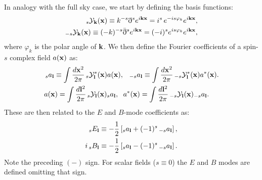 \documentclass[usenatbib]{mnrasb}
\begin{document}
      In analogy with the full sky case, we start by defining the basis functions:
      \begin{align}
        \,_s{\cal Y}_{\bf k}({\bf x})\equiv k^{-s}\eth^se^{i{\bf k}{\bf x}}=i^s\,e^{-is\varphi_k}e^{i{\bf k}{\bf x}},\\
        _{-s}{\cal Y}_{\bf k}({\bf x})\equiv (-k)^{-s}\bar{\eth}^se^{i{\bf k}{\bf x}}=(-i)^se^{is\varphi_k}e^{i{\bf k}{\bf x}},
      \end{align}
      where $\varphi_k$ is the polar angle of ${\bf k}$. We then define the Fourier coefficients of a spin-$s$ complex field $a({\bf x})$ as:
      \begin{align}\nonumber
        &\,_sa_{\bf l}\equiv\int\frac{d{\bf x}^2}{2\pi}\,_s{\cal Y}^*_{\bf l}({\bf x})a({\bf x}),\hspace{6pt}
        \,_{-s}a_{\bf l}\equiv\int\frac{d{\bf x}^2}{2\pi}\,_{-s}{\cal Y}^*_{\bf l}({\bf x})a^*({\bf x}).\\\label{eq:fft0}
        &a({\bf x})  =\int\frac{d{\bf l}^2}{2\pi}\,_s{\cal Y}_{\bf l}({\bf x})_sa_{\bf l},\hspace{6pt}
        a^*({\bf x})=\int\frac{d{\bf l}^2}{2\pi}\,_{-s}{\cal Y}_{\bf l}({\bf x})_{-s}a_{\bf l}.
      \end{align}
      These are then related to the $E$ and $B$-mode coefficients as:
      \begin{align}
        _sE_{\bf l}&\equiv-\frac{1}{2}\left[_sa_{\bf l}+(-1)^s\,_{-s}a_{\bf l}\right],\\
        i\,_sB_{\bf l}&\equiv-\frac{1}{2}\left[_sa_{\bf l}-(-1)^s\,_{-s}a_{\bf l}\right].
      \end{align}
      Note the preceding $(-)$ sign. For scalar fields ($s\equiv0$) the $E$ and $B$ modes are defined omitting that sign.
    
\end{document}
